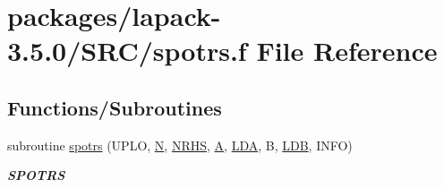 \hypertarget{spotrs_8f}{}\section{packages/lapack-\/3.5.0/\+S\+R\+C/spotrs.f File Reference}
\label{spotrs_8f}
\subsection*{Functions/\+Subroutines}
\begin{DoxyCompactItemize}
\item 
subroutine \hyperlink{group__realPOcomputational_gaf5cc1531aa5ffe706533fbca343d55dd}{spotrs} (U\+P\+L\+O, \hyperlink{polmisc_8c_a0240ac851181b84ac374872dc5434ee4}{N}, \hyperlink{example__user_8c_aa0138da002ce2a90360df2f521eb3198}{N\+R\+H\+S}, \hyperlink{classA}{A}, \hyperlink{example__user_8c_ae946da542ce0db94dced19b2ecefd1aa}{L\+D\+A}, B, \hyperlink{example__user_8c_a50e90a7104df172b5a89a06c47fcca04}{L\+D\+B}, I\+N\+F\+O)
\begin{DoxyCompactList}\small\item\em {\bfseries S\+P\+O\+T\+R\+S} \end{DoxyCompactList}\end{DoxyCompactItemize}
